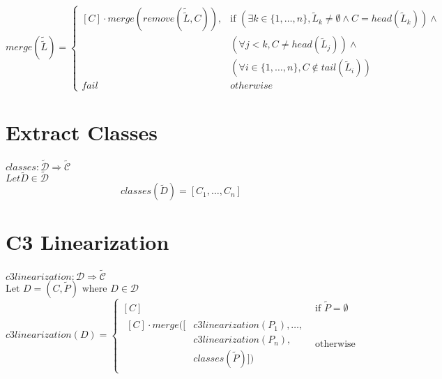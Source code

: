 \documentclass{article}
\begin{document}
\[
merge(\tilde{\tilde{L}}) =
\begin{cases}
[C] \cdot merge(remove(\tilde{\tilde{L}}, C)), & \text{if } (\exists k \in \{1, \ldots, n\}, \tilde{L}_k \neq \emptyset \land C = head(\tilde{L}_k)) \land \\
& (\forall j < k, C \neq head(\tilde{L}_j)) \land \\ 
& (\forall i \in \{1,\ldots,n\},C \notin tail(\tilde{L}_i)) \\ 

fail  & otherwise
\end{cases}
\]

\vspace{2cm}
\section*{Extract Classes}
$classes : \tilde{\mathcal{D}} \Rightarrow \tilde{\mathcal{C}}$\\
$Let \tilde{D} \in \mathcal{\tilde{D}} $\\

\[
classes(\tilde{D}) = [C_1, \ldots, C_n]
\]
\vspace{2cm}
\section*{C3 Linearization}
$c3linearization : \mathcal{D} \Rightarrow \tilde{\mathcal{C}}$\\
$\text{Let } D = (C, \tilde{P}) \text{ where } D \in \mathcal{D}$\\
\[
c3linearization(D) =
\begin{cases}
[C] & \text{if } \tilde{P} = \emptyset \\
\begin{split}
[C] \cdot merge([&c3linearization(P_1), \ldots, \\
         &c3linearization(P_n), \\
         &classes(\tilde{P})]) 
\end{split} & \text{otherwise}
\end{cases}
\]
\end{document}
